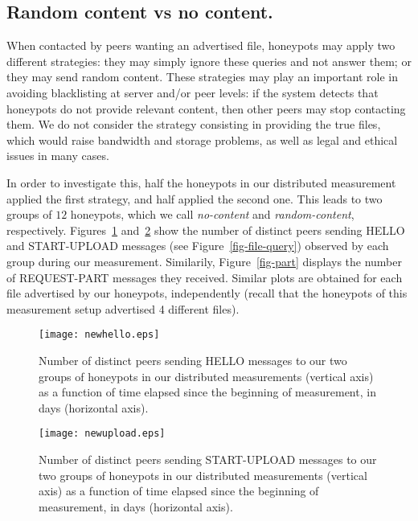 \documentclass[final,
notitlepage,
narroweqnarray,
	inline,
	twoside,
]{ieee}
\begin{document}
\subsection{Random content vs no content.}
\label{sec-random}

When contacted by peers wanting an  advertised file, honeypots may
apply two different strategies: they may simply ignore these queries
and not answer them; or they may send random content. These strategies may play an
important role in avoiding blacklisting at server and/or peer levels:
if the system detects that honeypots do not provide relevant
content, then other peers may stop contacting them. We do
  not consider the strategy consisting in providing the true files,
  which would raise bandwidth and storage problems, as well as legal
  and ethical issues in many cases.

In order to investigate this, half the honeypots in our distributed measurement applied the first strategy, and half applied the second one. This leads to two groups of $12$ honeypots, which we call {\em no-content} and {\em random-content}, respectively. Figures~\ref{fig-hello} and~\ref{fig-upload} show the number of distinct peers sending HELLO and START-UPLOAD messages (see Figure~\ref{fig-file-query}) observed by each group during our measurement. Similarily, Figure~\ref{fig-part} displays the number of REQUEST-PART messages they received. Similar plots are obtained for each file advertised by our honeypots, independently (recall that the honeypots of this measurement setup advertised 4 different files).

\begin{figure}[h!]
  \centering
  \texttt{[image: newhello.eps]}
  \caption{Number of distinct peers sending HELLO messages to our two
    groups of honeypots in our distributed measurements (vertical axis) as a function of time elapsed
    since the beginning of measurement, in days (horizontal axis).}
  \label{fig-hello}
\end{figure}

\begin{figure}[h!]
  \centering
  \texttt{[image: newupload.eps]}
  \caption{Number of distinct peers sending START-UPLOAD messages to
    our two groups of honeypots in our distributed measurements (vertical axis) as a function of time
    elapsed since the beginning of measurement, in days (horizontal
    axis).}
  \label{fig-upload}
\end{figure}
\end{document}
